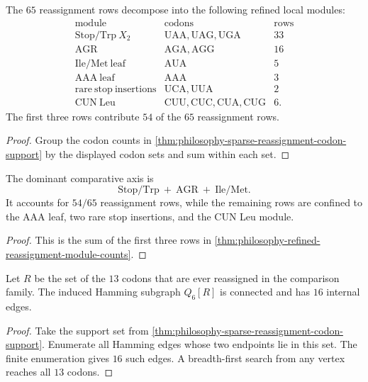 \begin{theorem}
\label{thm:philosophy-refined-reassignment-module-counts}
The $65$ reassignment rows decompose into the following refined local
modules:
$$
\begin{array}{c|c|r}
  \text{module} & \text{codons} & \text{rows}\\
\hline
  \mathrm{Stop/Trp}\ X_{2} & \mathrm{UAA},\mathrm{UAG},\mathrm{UGA} & 33\\
  \mathrm{AGR} & \mathrm{AGA},\mathrm{AGG} & 16\\
  \mathrm{Ile/Met\ leaf} & \mathrm{AUA} & 5\\
  \mathrm{AAA\ leaf} & \mathrm{AAA} & 3\\
  \mathrm{rare\ stop\ insertions} & \mathrm{UCA},\mathrm{UUA} & 2\\
  \mathrm{CUN\ Leu} & \mathrm{CUU},\mathrm{CUC},\mathrm{CUA},\mathrm{CUG} & 6.
\end{array}
$$
The first three rows contribute $54$ of the $65$ reassignment rows.
\end{theorem}
\begin{proof}
Group the codon counts in
\autoref{thm:philosophy-sparse-reassignment-codon-support} by the
displayed codon sets and sum within each set.
\end{proof}

\begin{corollary}
\label{cor:philosophy-main-comparative-axis}
The dominant comparative axis is
$$
  \mathrm{Stop/Trp}\ +\ \mathrm{AGR}\ +\ \mathrm{Ile/Met}.
$$
It accounts for $54/65$ reassignment rows, while the remaining rows are
confined to the AAA leaf, two rare stop insertions, and the CUN Leu
module.
\end{corollary}
\begin{proof}
This is the sum of the first three rows in
\autoref{thm:philosophy-refined-reassignment-module-counts}.
\end{proof}

\begin{theorem}
\label{thm:philosophy-connected-reassignment-support}
Let $R$ be the set of the $13$ codons that are ever reassigned in the
comparison family. The induced Hamming subgraph $Q_{6}[R]$ is connected
and has $16$ internal edges.
\end{theorem}
\begin{proof}
Take the support set from
\autoref{thm:philosophy-sparse-reassignment-codon-support}. Enumerate
all Hamming edges whose two endpoints lie in this set. The finite
enumeration gives $16$ such edges. A breadth-first search from any
vertex reaches all $13$ codons.
\end{proof}


